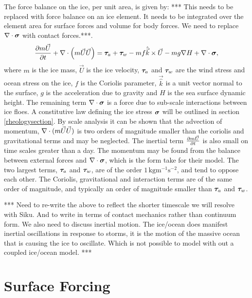 The force balance on the ice, per unit area, is given by: 
{\color{red} *** This needs to be replaced with force balance on an ice element. It needs to be integrated over the element area for surface forces and volume for body forces. We need to replace $\nabla\cdot{{\boldsymbol{\sigma}}}$ with contact forces.***.}
% 
\begin{equation} 
\label{Ueqn}
    {\partial m \Vec{U} \over \partial t } + \nabla\cdot{ \left ( m \Vec{U} \Vec{U} \right )} = 
     {\boldsymbol{\tau}}_a + {\boldsymbol{\tau}}_w - m f \hat{\Vec{k}} \times \Vec{U} - m g \nabla H
    + \nabla\cdot{{\boldsymbol{\sigma}}} ,
\end{equation}
%
where $m$ is the ice mass, $\Vec{U}$ is the ice velocity, ${\boldsymbol{\tau}}_a$ and ${\boldsymbol{\tau}}_w$ are the wind stress and ocean stress on the ice, $f$ is the Coriolis parameter, $\Vec{\hat{k}}$ is a unit vector normal to the surface, $g$ is the acceleration due to gravity and $H$ is the sea surface dynamic height. The remaining term $\nabla\cdot{{\boldsymbol{\sigma}}}$ is a force due to sub-scale interactions between ice floes. A constitutive law defining the ice stress ${\boldsymbol{\sigma}}$ will be outlined in section \ref{rheologysection}. By scale analysis \cite{Hibler79} it can be shown that the advection of momentum, $\nabla\cdot{(m\Vec{U}\Vec{U})}$ is two orders of magnitude smaller than the coriolis and gravitational terms and may be  neglected. The inertial term ${\partial m\Vec{U} \over \partial t }$ is also small on time scales greater than a day. The momentum may be found from the balance between external forces and $\nabla\cdot{{\boldsymbol{\sigma}}}$, which is the form \cite{Tremblay&Mysak1997} take for their model. The two largest terms, ${\boldsymbol{\tau}}_a$ and ${\boldsymbol{\tau}}_w$, are of the order $1 \, \mathrm{kg m^{-1} s^{-2}}$, and tend to oppose each other. The Coriolis, gravitational and interaction terms are of the same order of magnitude, and typically an order of magnitude smaller than ${\boldsymbol{\tau}}_a$ and ${\boldsymbol{\tau}}_w$. 

{\color{red}*** Need to re-write the above to reflect the shorter timescale we will resolve with Siku. And to write in terms of contact mechanics rather than continuum form. We also need to discuss inertial motion. The ice/ocean does manifest inertial oscillations in response to storms, it is the motion of the massive ocean that is causing the ice to oscillate. Which is not possible to model with out a coupled ice/ocean model. ***}

\section{Surface Forcing}

